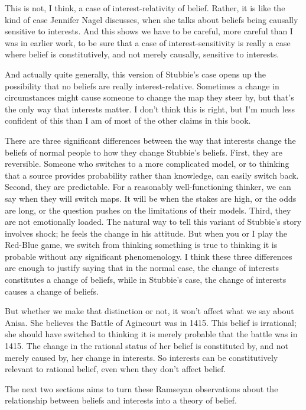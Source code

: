 \documentclass[
  11pt,
]{book}
\begin{document}
This is not, I think, a case of interest-relativity of belief. Rather, it is like the kind of case Jennifer Nagel \citeyearpar{Nagel2010} discusses, when she talks about beliefs being causally sensitive to interests. And this shows we have to be careful, more careful than I was in earlier work, to be sure that a case of interest-sensitivity is really a case where belief is constitutively, and not merely causally, sensitive to interests.

And actually quite generally, this version of Stubbie's case opens up the possibility that no beliefs are really interest-relative. Sometimes a change in circumstances might cause someone to change the map they steer by, but that's the only way that interests matter. I don't think this is right, but I'm much less confident of this than I am of most of the other claims in this book.

There are three significant differences between the way that interests change the beliefs of normal people to how they change Stubbie's beliefs. First, they are reversible. Someone who switches to a more complicated model, or to thinking that a source provides probability rather than knowledge, can easily switch back. Second, they are predictable. For a reasonably well-functioning thinker, we can say when they will switch maps. It will be when the stakes are high, or the odds are long, or the question pushes on the limitations of their models. Third, they are not emotionally loaded. The natural way to tell this variant of Stubbie's story involves shock; he feels the change in his attitude. But when you or I play the Red-Blue game, we switch from thinking something is true to thinking it is probable without any significant phenomenology. I think these three differences are enough to justify saying that in the normal case, the change of interests constitutes a change of beliefs, while in Stubbie's case, the change of interests causes a change of beliefs.

But whether we make that distinction or not, it won't affect what we say about Anisa. She believes the Battle of Agincourt was in 1415. This belief is irrational; she should have switched to thinking it is merely probable that the battle was in 1415. The change in the rational status of her belief is constituted by, and not merely caused by, her change in interests. So interests can be constitutively relevant to rational belief, even when they don't affect belief.

The next two sections aims to turn these Ramseyan observations about the relationship between beliefs and interests into a theory of belief.
\end{document}

